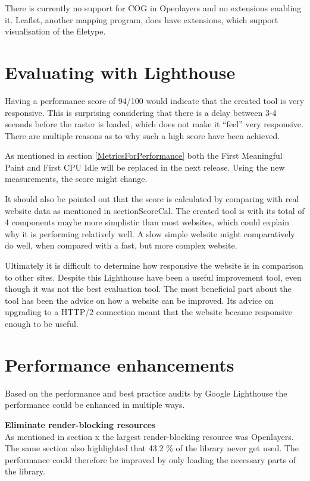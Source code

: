 There is currently no support for COG in Openlayers and no extensions enabling it. Leaflet, another mapping program, does have extensions, which support visualisation of the filetype.
\citep{COGopenlayers}

\section{Evaluating with Lighthouse}

Having a performance score of 94/100 would indicate that the created tool is very responsive. This is surprising considering that there is a delay between 3-4 seconds before the raster is loaded, which does not make it “feel” very responsive. There are multiple reasons as to why such a high score have been achieved.

As mentioned in section \ref{MetricsForPerformance} both the First Meaningful Paint and First CPU Idle will be replaced in the next release. Using the new measurements, the score might change.
 
It should also be pointed out that the score is calculated by comparing with real website data as mentioned in section{ScoreCal}. The created tool is with its total of 4 components maybe more simplistic than most websites, which could explain why it is performing relatively well. A slow simple website might comparatively do well, when compared with a fast, but more complex website.

Ultimately it is difficult to determine how responsive the website is in comparison to other sites. Despite this Lighthouse have been a useful improvement tool, even though it was not the best evaluation tool. The most beneficial part about the tool has been the advice on how a website can be improved. Its advice on upgrading to a HTTP/2 connection meant that the website became responsive enough to be useful.  


\section{Performance enhancements}

Based on the performance and best practice audits by Google Lighthouse the performance could be enhanced in multiple ways. 

\textbf{Eliminate render-blocking resources}\\
As mentioned in section x the largest render-blocking resource was Openlayers. The same section also highlighted that 43.2 \% of the library never get used. The performance could therefore be improved by only loading the necessary parts of the library. 

